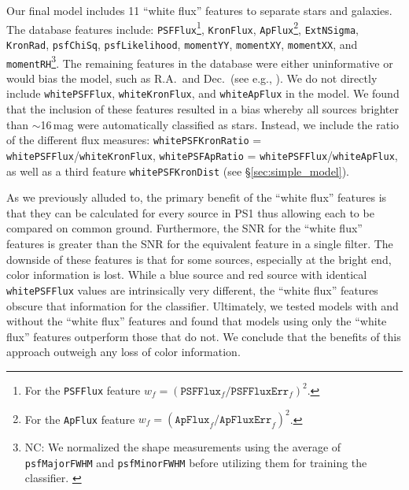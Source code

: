 \documentclass[twocolumn]{aastex62}
\newcommand{\NC}[1]{{\color{brown} NC: {#1}}}
\begin{document}
Our final model includes 11 ``white flux'' features to separate stars and galaxies. The database features include: \texttt{PSFFlux}\footnote{For the \texttt{PSFFlux} feature $w_f = (\mathtt{PSFFlux}_f/\mathtt{PSFFluxErr}_f)^2$.}, \texttt{KronFlux}, \texttt{ApFlux}\footnote{For the \texttt{ApFlux} feature $w_f = (\mathtt{ApFlux}_f/\mathtt{ApFluxErr}_f)^2$.}, \texttt{ExtNSigma}, \texttt{KronRad}, \texttt{psfChiSq}, \texttt{psfLikelihood}, \texttt{momentYY}, \texttt{momentXY}, \texttt{momentXX}, and \texttt{momentRH}\footnote{\NC{We normalized the shape measurements using the average of \texttt{psfMajorFWHM} and  \texttt{psfMinorFWHM} before utilizing them for training the classifier. }}. The remaining features in the database were either uninformative or would bias the model, such as R.A.\ and Dec.\ (see e.g., \citealt{Richards12a,Miller17}). We do not directly include \texttt{whitePSFFlux}, \texttt{whiteKronFlux}, and \texttt{whiteApFlux} in the model. We found that the inclusion of these features resulted in a bias whereby all sources brighter than $\sim$16\,mag were automatically classified as stars. Instead, we include the ratio of the different flux measures: \texttt{whitePSFKronRatio} = \texttt{whitePSFFlux}/\texttt{whiteKronFlux}, \texttt{whitePSFApRatio} = \texttt{whitePSFFlux}/\texttt{whiteApFlux}, as well as a third feature \texttt{whitePSFKronDist} (see \S\ref{sec:simple_model}).

As we previously alluded to, the primary benefit of the ``white flux'' features is that they can be calculated for every source in PS1 thus allowing each to be compared on common ground. Furthermore, the SNR for the ``white flux'' features is greater than the SNR for the equivalent feature in a single filter. The downside of these features is that for some sources, especially at the bright end, color information is lost. While a blue source and red source with identical \texttt{whitePSFFlux} values are intrinsically very different, the ``white flux'' features obscure that information for the classifier. Ultimately, we tested models with and without the ``white flux'' features and found that models using only the ``white flux'' features outperform those that do not. We conclude that the benefits of this approach outweigh any loss of color information. 
\end{document}
